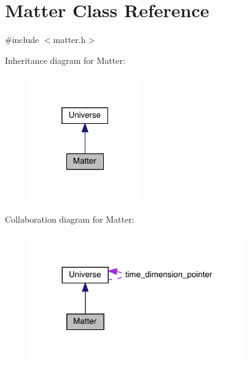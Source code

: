 \hypertarget{class_matter}{}\section{Matter Class Reference}
\label{class_matter}


{\ttfamily \#include $<$matter.\+h$>$}



Inheritance diagram for Matter\+:\nopagebreak
\begin{figure}[H]
\begin{center}
\leavevmode
\includegraphics[width=136pt]{class_matter__inherit__graph}
\end{center}
\end{figure}


Collaboration diagram for Matter\+:
\nopagebreak
\begin{figure}[H]
\begin{center}
\leavevmode
\includegraphics[width=263pt]{class_matter__coll__graph}
\end{center}
\end{figure}
